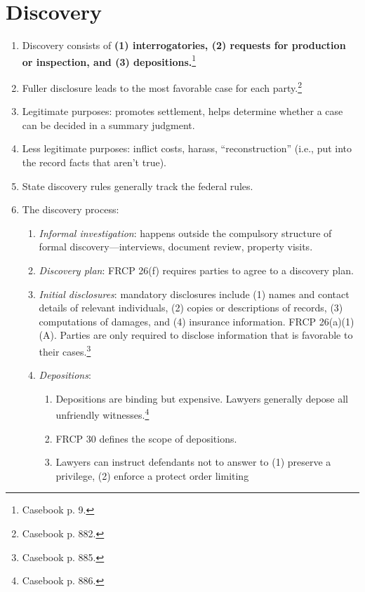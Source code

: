 \section{Discovery}

\begin{enumerate}
    \item Discovery consists of \textbf{(1) interrogatories, (2) requests for 
    production or inspection, and (3) depositions.}\footnote{Casebook p. 9.}
    \item Fuller disclosure leads to the most favorable case for each 
    party.\footnote{Casebook p. 882.}
    \item Legitimate purposes: promotes settlement, helps determine whether a 
    case can be decided in a summary judgment.
    \item Less legitimate purposes: inflict costs, harass, ``reconstruction'' 
    (i.e., put into the record facts that aren't true).
    \item State discovery rules generally track the federal rules.
    \item The discovery process:
    \begin{enumerate}
        \item \emph{Informal investigation}: happens outside the compulsory 
        structure of formal discovery---interviews, document review, property 
        visits.
        \item \emph{Discovery plan}: FRCP 26(f) requires parties to agree to a 
        discovery plan.
        \item \emph{Initial disclosures}: mandatory disclosures include (1) 
        names and contact details of relevant individuals, (2) copies or 
        descriptions of records, (3) computations of damages, and (4) 
        insurance information. FRCP 26(a)(1)(A). Parties are only required to 
        disclose information that is favorable to their 
        cases.\footnote{Casebook p. 885.}
        \item \emph{Depositions}:
        \begin{enumerate}
            \item Depositions are binding but expensive. Lawyers generally 
            depose all unfriendly witnesses.\footnote{Casebook p. 886.}
            \item FRCP 30 defines the scope of depositions.
            \item Lawyers can instruct defendants not to answer to (1) 
            preserve a privilege, (2) enforce a protect order limiting 

\end{enumerate}
\end{enumerate}
\end{enumerate}
